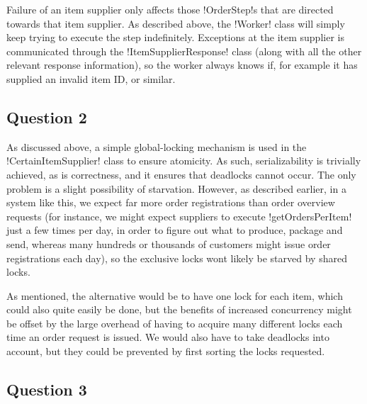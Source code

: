\documentclass[a4paper, 12pt]{article}
\begin{document}

Failure of an item supplier only affects those !OrderStep!s that are
directed towards that item supplier. As described above, the !Worker!
class will simply keep trying to execute the step
indefinitely. Exceptions at the item supplier is communicated through
the !ItemSupplierResponse! class (along with all the other relevant
response information), so the worker always knows if, for example it
has supplied an invalid item ID, or similar.

\subsection*{Question 2}





As discussed above, a simple global-locking mechanism is used in the
!CertainItemSupplier! class to ensure atomicity. As such,
serializability is trivially achieved, as is correctness, and it
ensures that deadlocks cannot occur. The only problem is a slight
possibility of starvation. However, as described earlier, in a system
like this, we expect far more order registrations than order overview
requests (for instance, we might expect suppliers to execute
!getOrdersPerItem! just a few times per day, in order to figure out
what to produce, package and send, whereas many hundreds or thousands
of customers might issue order registrations each day), so the
exclusive locks wont likely be starved by shared locks.

As mentioned, the alternative would be to have one lock for each item,
which could also quite easily be done, but the benefits of increased
concurrency might be offset by the large overhead of having to acquire
many different locks each time an order request is issued. We would
also have to take deadlocks into account, but they could be prevented
by first sorting the locks requested.

\subsection*{Question 3}
\end{document}
